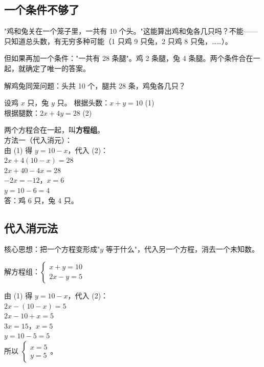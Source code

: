 

\subsection*{一个条件不够了}

"鸡和兔关在一个笼子里，一共有 10 个头。"这能算出鸡和兔各几只吗？不能——只知道总头数，有无穷多种可能（1 只鸡 9 只兔，2 只鸡 8 只兔，……）。

但如果再加一个条件："一共有 28 条腿"。鸡 2 条腿，兔 4 条腿。两个条件合在一起，就确定了唯一的答案。

\begin{example}
解鸡兔同笼问题：头共 10 个，腿共 28 条，鸡兔各几只？
\end{example}
\begin{solution}
设鸡 $x$ 只，兔 $y$ 只。
根据头数：$x + y = 10$ \quad (1)\\
根据腿数：$2x + 4y = 28$ \quad (2)

两个方程合在一起，叫\textbf{方程组}。\\

方法一（代入消元）：\\
由 (1) 得 $y = 10 - x$，代入 (2)：\\
$2x + 4(10 - x) = 28$\\
$2x + 40 - 4x = 28$\\
$-2x = -12$，$x = 6$\\
$y = 10 - 6 = 4$\\
答：鸡 6 只，兔 4 只。
\end{solution}

\subsection*{代入消元法}

核心思想：把一个方程变形成"$y$ 等于什么"，代入另一个方程，消去一个未知数。

\begin{example}
解方程组：$\begin{cases}x + y = 10\\2x - y = 5\end{cases}$
\end{example}
\begin{solution}
由 (1) 得 $y = 10 - x$，代入 (2)：\\
$2x - (10 - x) = 5$\\
$2x - 10 + x = 5$\\
$3x = 15$，$x = 5$\\
$y = 10 - 5 = 5$\\
所以 $\begin{cases}x=5\\y=5\end{cases}$。
\end{solution}

